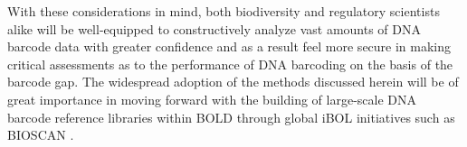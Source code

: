 With these considerations in mind, both biodiversity and regulatory scientists alike will be well-equipped to constructively analyze vast amounts of DNA barcode data with greater confidence and as a result feel more secure in making critical assessments as to the performance of DNA barcoding on the basis of the barcode gap. The widespread adoption of the methods discussed herein will be of great importance in moving forward with the building of large-scale DNA barcode reference libraries within BOLD through global iBOL initiatives such as BIOSCAN \cite{hobern2020bioscan, hobern2019bioscan}.  

